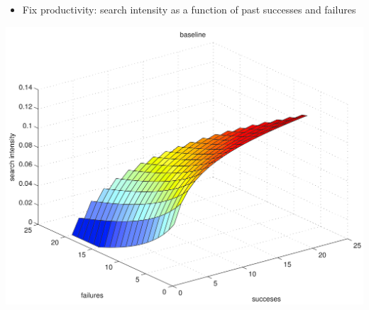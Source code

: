 \documentclass[notes=show]{beamer}
\begin{document}
\begin{frame}%


\begin{itemize}
\item Fix productivity: search intensity as a function of past successes and failures
\end{itemize}

\includegraphics[scale=0.07]{figs/baseline_policy.png}

\end{frame}%
\end{document}
